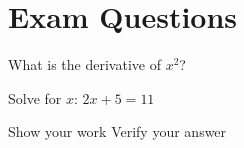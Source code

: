 \documentclass{article}
\begin{document}
\section{Exam Questions}
\begin{questions}
\question What is the derivative of $x^2$?

\question Solve for $x$: $2x + 5 = 11$
\begin{subparts}
\subpart Show your work
\subpart Verify your answer
\end{subparts}
\end{questions}
\end{document}
